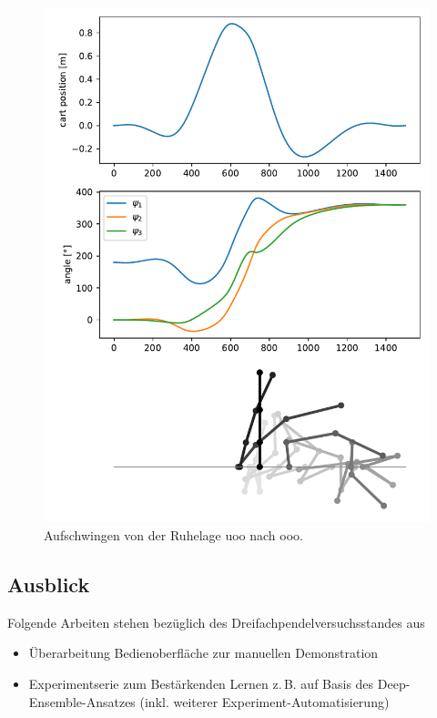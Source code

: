 \documentclass[a4paper,10pt]{scrartcl}
\begin{document}
\begin{figure}
    \centering
    \includegraphics[scale=0.7]{img/uoo_ooo_3.0_around.csv.pdf}
    \caption{Aufschwingen von der Ruhelage uoo nach ooo.}
    \label{fig:uoo_ooo}
\end{figure}
    

\subsection{Ausblick}

Folgende Arbeiten stehen bezüglich des Dreifachpendelversuchsstandes aus

\begin{itemize}
 \item Überarbeitung Bedienoberfläche zur manuellen Demonstration
 \item Experimentserie zum Bestärkenden Lernen z.\,B. auf Basis des Deep-Ensemble-Ansatzes
 (inkl. weiterer Experiment-Automatisierung)
\end{itemize}
\end{document}
